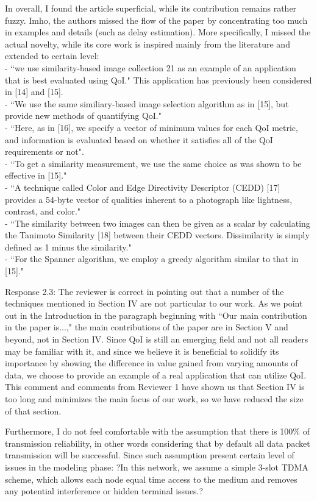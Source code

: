 \documentclass[12pt, letterpaper, onecolumn]{IEEEtran}
\begin{document}
In overall, I found the article superficial, while its contribution remains rather fuzzy. Imho, the authors missed the flow of the paper by concentrating too much in examples and details (such as delay estimation). More specifically, I missed the actual novelty, while its core work is inspired mainly from the literature and extended to certain level: \\
- ``we use similarity-based image collection 21 as an example of an application that is best evaluated using QoI." This application has previously been considered in [14] and [15]. \\
- ``We use the same similiary-based image selection algorithm as in [15], but provide new methods of quantifying QoI." \\
- ``Here, as in [16], we specify a vector of minimum values for each QoI metric, and information is evaluated based on whether it satisfies all of the QoI requirements or not". \\
- ``To get a similarity measurement, we use the same choice as was shown to be effective in [15]." \\
- ``A technique called Color and Edge Directivity Descriptor (CEDD) [17] provides a 54-byte vector of qualities inherent to a photograph like lightness, contrast, and color." \\
- ``The similarity between two images can then be given as a scalar by calculating the Tanimoto Similarity [18] between their CEDD vectors. Dissimilarity is simply defined as 1 minus the similarity." \\
- ``For the Spanner algorithm, we employ a greedy algorithm similar to that in [15]." 

{\color{blue}
Response 2.3: The reviewer is correct in pointing out that a number of the techniques mentioned in Section IV are not particular to our work. As we point out in the Introduction in the paragraph beginning with ``Our main contribution in the paper is...," the main contributions of the paper are in Section V and beyond, not in Section IV. Since QoI is still an emerging field and not all readers may be familiar with it, and since we believe it is beneficial to solidify its importance by showing the difference in value gained from varying amounts of data, we choose to provide an example of a real application that can utilize QoI. This comment and comments from Reviewer 1 have shown us that Section IV is too long and minimizes the main focus of our work, so we have reduced the size of that section.
}

Furthermore, I do not feel comfortable with the assumption that there is 100\% of transmission reliability, in other words considering that by default all data packet transmission will be successful. Since such assumption present certain level of issues in the modeling phase: ?In this network, we assume a simple 3-slot TDMA scheme, which allows each node equal time access to the medium and removes any potential interference or hidden terminal issues.? 
\end{document}
